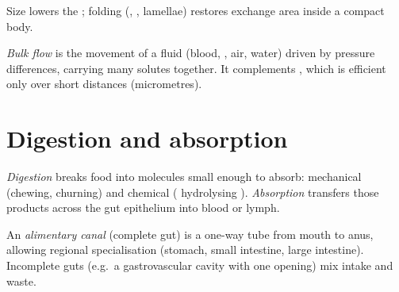 \begin{omfigure}

{\small Size lowers the ; folding (, ,
lamellae) restores exchange area inside a compact body.}
\end{omfigure}

\begin{definition}\label{def:g12:animal-exchange:bulk}
\emph{Bulk flow} is the movement of a fluid (blood,
, air, water) driven by pressure differences, carrying many
solutes together. It complements , which is efficient only over
short distances (micrometres).
\end{definition}

\section{Digestion and absorption}

\begin{definition}[Digestion]\label{def:g12:animal-exchange:digestion}
\emph{Digestion} breaks food into molecules small
enough to absorb: mechanical (chewing, churning) and chemical (
hydrolysing ). \emph{Absorption} transfers
those products across the gut epithelium into blood or lymph.
\end{definition}

\begin{definition}\label{def:g12:animal-exchange:canal}
An \emph{alimentary canal} (complete gut) is a
one-way tube from mouth to anus, allowing regional specialisation
(stomach, small intestine, large intestine). Incomplete guts (e.g.\ a
gastrovascular cavity with one opening) mix intake and waste.
\end{definition}

